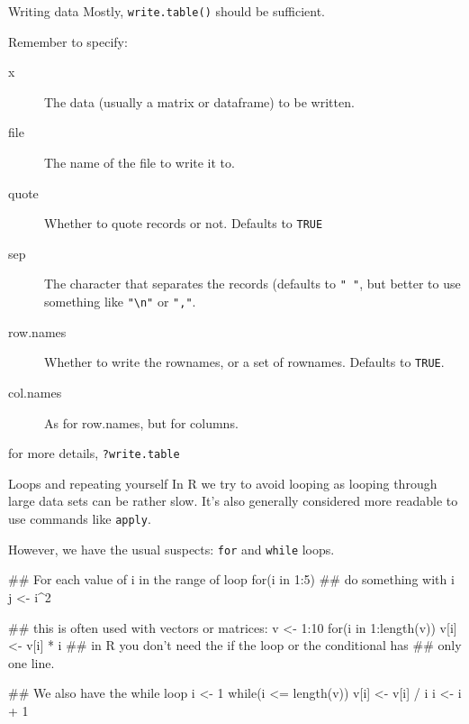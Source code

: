 \documentclass[pdf]{beamer}
\begin{document}
\begin{frame}[fragile]{Writing data}
  Mostly, \texttt{write.table()} should be sufficient.
  
  Remember to specify:
  \begin{description}
  \item[x] The data (usually a matrix or dataframe) to be written.
  \item[file] The name of the file to write it to.
  \item[quote] Whether to quote records or not. Defaults to \texttt{TRUE}
  \item[sep] The character that separates the records (defaults to \texttt{"
    "}, but better to use something like \verb|"\n"| or \verb|","|.
  \item[row.names] Whether to write the rownames, 
    or a set of rownames. Defaults to \texttt{TRUE}.
  \item[col.names] As for row.names, but for columns.
  \end{description}

  for more details, \texttt{?write.table}
\end{frame}

\begin{frame}[fragile]{Loops and repeating yourself}
  In R we try to avoid looping as looping through large data
  sets can be rather slow. It's also generally considered
  more readable to use commands like \texttt{apply}.

  However, we have the usual suspects: \texttt{for} and \texttt{while}
  loops.
  
  \begin{rcode}
    ## For each value of i in the range of loop
    for(i in 1:5){
      ## do something with i
      j <- i^2
    }
    
    ## this is often used with vectors or matrices:
    v <- 1:10
    for(i in 1:length(v))
       v[i] <- v[i] * i
    ## in R you don't need the {} if the loop or the conditional has
    ## only one line.
    
    ## We also have the while loop
    i <- 1
    while(i <= length(v)){
       v[i] <- v[i] / i
       i <- i + 1
    }
  \end{rcode}
\end{frame}
\end{document}
